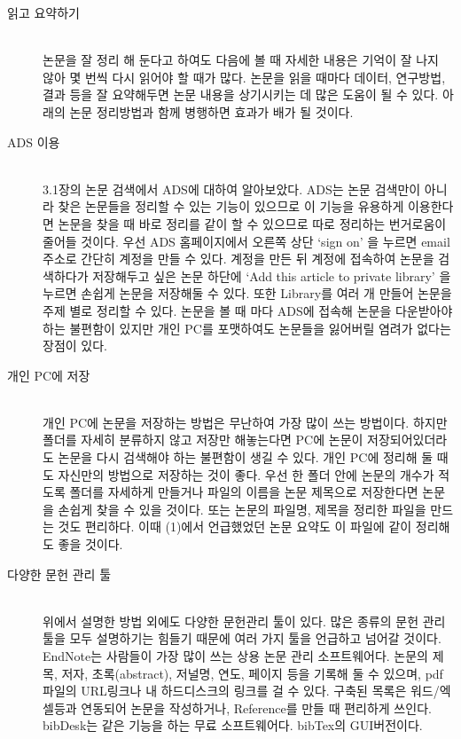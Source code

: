 \begin{description}
\item[읽고 요약하기] \hfill \\
  논문을 잘 정리 해 둔다고 하여도 다음에 볼 때 자세한 내용은 기억이 잘 나지 않아
  몇 번씩 다시 읽어야 할 때가 많다. 논문을 읽을 때마다 데이터, 연구방법, 결과
  등을 잘 요약해두면 논문 내용을 상기시키는 데 많은 도움이 될 수 있다. 아래의
  논문 정리방법과 함께 병행하면 효과가 배가 될 것이다.
\item[ADS 이용] \hfill \\
  3.1장의 논문 검색에서 ADS에 대하여 알아보았다. ADS는 논문 검색만이 아니라 찾은
  논문들을 정리할 수 있는 기능이 있으므로 이 기능을 유용하게 이용한다면 논문을
  찾을 때 바로 정리를 같이 할 수 있으므로 따로 정리하는 번거로움이 줄어들
  것이다. 우선 ADS 홈페이지에서 오른쪽 상단 ‘sign on’ 을 누르면 email 주소로
  간단히 계정을 만들 수 있다. 계정을 만든 뒤 계정에 접속하여 논문을 검색하다가
  저장해두고 싶은 논문 하단에 ‘Add this article to private library’ 을 누르면
  손쉽게 논문을 저장해둘 수 있다. 또한 Library를 여러 개 만들어 논문을 주제 별로
  정리할 수 있다. 논문을 볼 때 마다 ADS에 접속해 논문을 다운받아야 하는 불편함이
  있지만 개인 PC를 포맷하여도 논문들을 잃어버릴 염려가 없다는 장점이 있다.
\item[개인 PC에 저장] \hfill \\
  개인 PC에 논문을 저장하는 방법은 무난하여 가장 많이 쓰는 방법이다. 하지만
  폴더를 자세히 분류하지 않고 저장만 해놓는다면 PC에 논문이 저장되어있더라도
  논문을 다시 검색해야 하는 불편함이 생길 수 있다. 개인 PC에 정리해 둘 때도
  자신만의 방법으로 저장하는 것이 좋다. 우선 한 폴더 안에 논문의 개수가 적도록
  폴더를 자세하게 만들거나 파일의 이름을 논문 제목으로 저장한다면 논문을 손쉽게
  찾을 수 있을 것이다. 또는 논문의 파일명, 제목을 정리한 파일을 만드는 것도
  편리하다. 이때 (1)에서 언급했었던 논문 요약도 이 파일에 같이 정리해도 좋을
  것이다.
\item[다양한 문헌 관리 툴] \hfill \\
  위에서 설명한 방법 외에도 다양한 문헌관리 툴이 있다. 많은 종류의 문헌 관리 툴을
  모두 설명하기는 힘들기 때문에 여러 가지 툴을 언급하고 넘어갈 것이다. EndNote는
  사람들이 가장 많이 쓰는 상용 논문 관리 소프트웨어다. 논문의 제목, 저자,
  초록(abstract), 저널명, 연도, 페이지 등을 기록해 둘 수 있으며, pdf파일의
  URL링크나 내 하드디스크의 링크를 걸 수 있다. 구축된 목록은 워드/엑셀등과
  연동되어 논문을 작성하거나, Reference를 만들 때 편리하게 쓰인다. bibDesk는 같은
  기능을 하는 무료 소프트웨어다. bibTex의 GUI버전이다.


\end{description}
